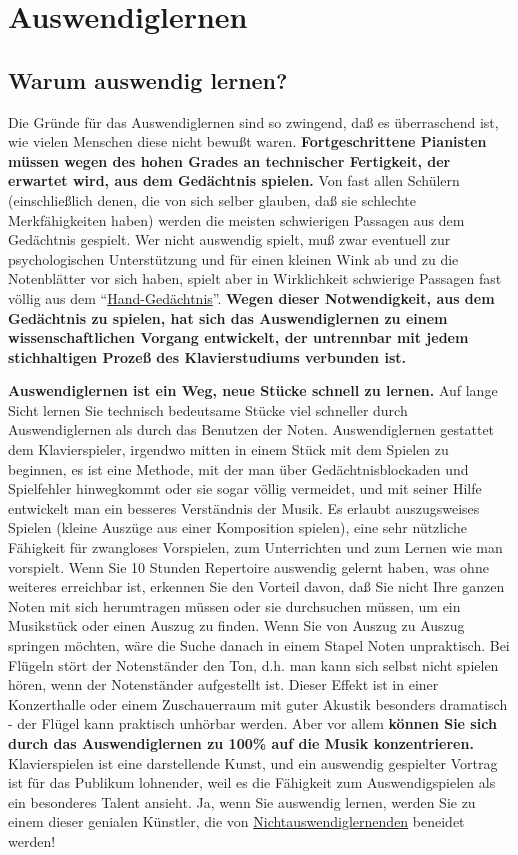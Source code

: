 
\section{Auswendiglernen}
\label{c1iii6} 

\subsection{Warum auswendig lernen?}
\label{c1iii6a}

Die Gründe für das Auswendiglernen sind so zwingend, daß es überraschend ist, wie vielen Menschen diese nicht bewußt waren.
\textbf{Fortgeschrittene Pianisten müssen wegen des hohen Grades an technischer Fertigkeit, der erwartet wird, aus dem Gedächtnis spielen.}
Von fast allen Schülern (einschließlich denen, die von sich selber glauben, daß sie schlechte Merkfähigkeiten haben) werden die meisten schwierigen Passagen aus dem Gedächtnis gespielt.
Wer nicht auswendig spielt, muß zwar eventuell zur psychologischen Unterstützung und für einen kleinen Wink ab und zu die Notenblätter vor sich haben, spielt aber in Wirklichkeit schwierige Passagen fast völlig aus dem \enquote{\hyperref[c1iii6d]{Hand-Gedächtnis}}.
\textbf{Wegen dieser Notwendigkeit, aus dem Gedächtnis zu spielen, hat sich das Auswendiglernen zu einem wissenschaftlichen Vorgang entwickelt, der untrennbar mit jedem stichhaltigen Prozeß des Klavierstudiums verbunden ist.}

\textbf{Auswendiglernen ist ein Weg, neue Stücke schnell zu lernen.}
Auf lange Sicht lernen Sie technisch bedeutsame Stücke viel schneller durch Auswendiglernen als durch das Benutzen der Noten.
Auswendiglernen gestattet dem Klavierspieler, irgendwo mitten in einem Stück mit dem Spielen zu beginnen, es ist eine Methode, mit der man über Gedächtnisblockaden und Spielfehler hinwegkommt oder sie sogar völlig vermeidet, und  mit seiner Hilfe entwickelt man ein besseres Verständnis der Musik.
Es erlaubt auszugsweises Spielen (kleine Auszüge aus einer Komposition spielen), eine sehr nützliche Fähigkeit für zwangloses Vorspielen, zum Unterrichten und zum Lernen wie man vorspielt.
Wenn Sie 10 Stunden Repertoire auswendig gelernt haben, was ohne weiteres erreichbar ist, erkennen Sie den Vorteil davon, daß Sie nicht Ihre ganzen Noten mit sich herumtragen müssen oder sie durchsuchen müssen, um ein Musikstück oder einen Auszug zu finden.
Wenn Sie von Auszug zu Auszug springen möchten, wäre die Suche danach in einem Stapel Noten unpraktisch.
Bei Flügeln stört der Notenständer den Ton, d.h. man kann sich selbst nicht spielen hören, wenn der Notenständer aufgestellt ist.
Dieser Effekt ist in einer Konzerthalle oder einem Zuschauerraum mit guter Akustik besonders dramatisch - der Flügel kann praktisch unhörbar werden.
Aber vor allem \textbf{können Sie sich durch das Auswendiglernen zu 100\% auf die Musik konzentrieren.}
Klavierspielen ist eine darstellende Kunst, und ein auswendig gespielter Vortrag ist für das Publikum lohnender, weil es die Fähigkeit zum Auswendigspielen als ein besonderes Talent ansieht.
Ja, wenn Sie auswendig lernen, werden Sie zu einem dieser genialen Künstler, die von \hyperref[memorizer]{Nichtauswendiglernenden} beneidet werden!

